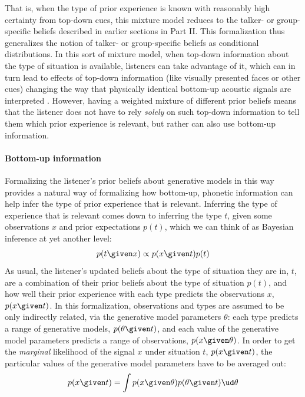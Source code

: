 That is, when the type of prior experience is known with reasonably high certainty from top-down cues, this mixture model reduces to the talker- or group-specific beliefs described in earlier sections in Part II.  This formalization thus generalizes the notion of talker- or group-specific beliefs as conditional distributions.  In this sort of mixture model, when top-down information about the type of situation is available, listeners can take advantage of it, which can in turn lead to effects of top-down information (like visually presented faces or other cues) changing the way that physically identical bottom-up acoustic signals are interpreted \autocite{Johnson1999,Hay2010,StaumCasasanto2008,Strand1996}.  However, having a weighted mixture of different prior beliefs means that the listener does not have to rely \emph{solely} on such top-down information to tell them which prior experience is relevant, but rather can also use bottom-up information.

\paragraph{Bottom-up information}
\label{sec:bott-up-inform}

Formalizing the listener's prior beliefs about generative models in this way provides a natural way of formalizing how bottom-up, phonetic information can help infer the type of prior experience that is relevant.  Inferring the type of experience that is relevant comes down to inferring the type $t$, given some observations $x$ and prior expectations $p(t)$, which we can think of as Bayesian inference at yet another level: 
\begin{equation}
  \label{eq:33}
  p(t \given x) \propto p(x \given t) p(t)
\end{equation}
As usual, the listener's updated beliefs about the type of situation they are in, $t$, are a combination of their prior beliefs about the type of situation $p(t)$, and how well their prior experience with each type predicts the observations $x$, $p(x\given t)$.  In this formalization, observations and types are assumed to be only indirectly related, via the generative model parameters $\theta$: each type predicts a range of generative models, $p(\theta \given t)$, and each value of the generative model parameters predicts a range of observations, $p(x \given \theta)$.  In order to get the \emph{marginal} likelihood of the signal $x$ under situation $t$, $p(x\given t)$, the particular values of the generative model parameters have to be averaged out:
\begin{equation}
  \label{eq:34}
  p(x \given t) = \int p(x \given \theta) p(\theta \given t) \ud \theta
\end{equation}

